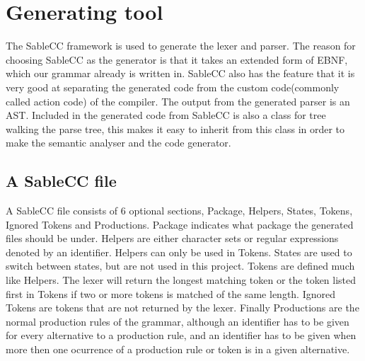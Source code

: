 \chapter{Generating tool}

The SableCC framework is used to generate the lexer and parser. The reason for choosing SableCC as the generator is that it takes an extended form of EBNF, which our grammar already is written in. SableCC also has the feature that it is very good at separating the generated code from the custom code(commonly called action code) of the compiler. The output from the generated parser is an AST. Included in the generated code from SableCC is also a class for tree walking the parse tree, this makes it easy to inherit  from this class in order to make the semantic analyser and the code generator. 

\section{A SableCC file}
A SableCC file consists of 6 optional sections, Package, Helpers, States, Tokens, Ignored Tokens and Productions.
Package indicates what package the generated files should be under. Helpers are either character sets or regular expressions denoted by an identifier. Helpers can only be used in Tokens. States are used to switch between states, but are not used in this project. Tokens are defined much like Helpers. The lexer will return the longest matching token or the token listed first in Tokens if two or more tokens is matched of the same length. Ignored Tokens are tokens that are not returned by the lexer. Finally Productions are the normal production rules of the grammar, although an identifier has to be given for every alternative to a production rule, and an identifier has to be given when more then one ocurrence of a production rule or token is in a given alternative.